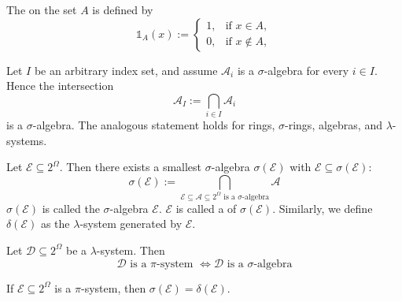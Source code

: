 \documentclass[12pt, a4paper, oneside, openright, titlepage]{book}
\begin{document}
\begin{defn}
    The  on the set $A$ is defined by \begin{equation*}
        \mathbb{1}_A(x) := \left\{\begin{array}{lc} 1, & \text{if } x \in A, \\ 0, & \text{if } x \notin A, \end{array}\right.
    \end{equation*}
\end{defn}

\begin{thm}
    Let $I$ be an arbitrary index set, and assume $\mathcal{A}_i$ is a $\sigma$-algebra for every $i \in I$. Hence the intersection \begin{equation*}
        \mathcal{A}_I := \bigcap_{i\in I}\mathcal{A}_i
    \end{equation*}
    is a $\sigma$-algebra. The analogous statement holds for rings, $\sigma$-rings, algebras, and $\lambda$-systems.
\end{thm}

\begin{thm}
    Let $\mathcal{E} \subseteq 2^{\Omega}$. Then there exists a smallest $\sigma$-algebra $\sigma(\mathcal{E})$ with $\mathcal{E} \subseteq \sigma(\mathcal{E})$: \begin{equation*}
        \sigma(\mathcal{E}) := \bigcap_{\mathcal{E}\subseteq \mathcal{A}\subseteq 2^{\Omega}\text{ is a $\sigma$-algebra}}\mathcal{A}
    \end{equation*}
    $\sigma(\mathcal{E})$ is called the $\sigma$-algebra  $\mathcal{E}$. $\mathcal{E}$ is called a  of $\sigma(\mathcal{E})$. Similarly, we define $\delta(\mathcal{E})$ as the $\lambda$-system generated by $\mathcal{E}$.
\end{thm}

\begin{thm}
    Let $\mathcal{D}\subseteq 2^{\Omega}$ be a $\lambda$-system. Then \begin{equation*}
        \mathcal{D}\text{ is a $\pi$-system } \iff \mathcal{D} \text{ is a $\sigma$-algebra}
    \end{equation*}
\end{thm}

\begin{namthm}
    If $\mathcal{E} \subseteq 2^{\Omega}$ is a $\pi$-system, then $\sigma(\mathcal{E}) = \delta(\mathcal{E})$.
\end{namthm}
\end{document}
